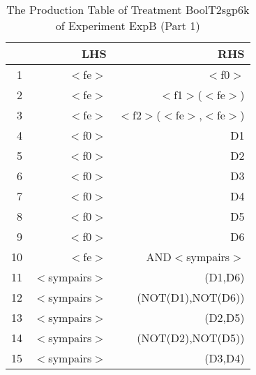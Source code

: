 \begin{table}[ht]
\centering
\begin{tabular}{rrr}
  \hline
 & LHS & RHS \\ 
  \hline
1 & $<$fe$>$ & $<$f0$>$ \\ 
  2 & $<$fe$>$ & $<$f1$>$($<$fe$>$) \\ 
  3 & $<$fe$>$ & $<$f2$>$($<$fe$>$,$<$fe$>$) \\ 
  4 & $<$f0$>$ & D1 \\ 
  5 & $<$f0$>$ & D2 \\ 
  6 & $<$f0$>$ & D3 \\ 
  7 & $<$f0$>$ & D4 \\ 
  8 & $<$f0$>$ & D5 \\ 
  9 & $<$f0$>$ & D6 \\ 
  10 & $<$fe$>$ & AND$<$sympairs$>$ \\ 
  11 & $<$sympairs$>$ & (D1,D6) \\ 
  12 & $<$sympairs$>$ & (NOT(D1),NOT(D6)) \\ 
  13 & $<$sympairs$>$ & (D2,D5) \\ 
  14 & $<$sympairs$>$ & (NOT(D2),NOT(D5)) \\ 
  15 & $<$sympairs$>$ & (D3,D4) \\ 
   \hline
\end{tabular}
\caption{The Production Table of Treatment BoolT2sgp6k of Experiment ExpB (Part 1)} 
\end{table}
